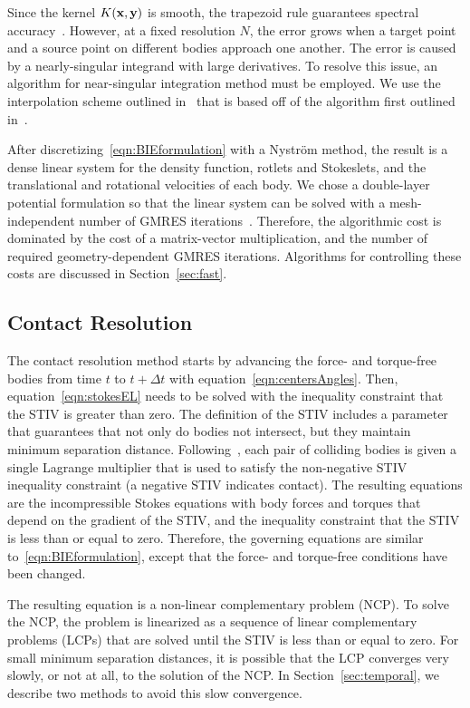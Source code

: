 \documentclass[AMA,STIX1COL]{WileyNJD-v2}
\begin{document}
Since the kernel $K({\mathbf{x}},{\mathbf{y}})$ is smooth, the trapezoid rule guarantees
spectral accuracy~\cite{Trefethan2014}.  However, at a fixed resolution
$N$, the error grows when a target point and a source point on different
bodies approach one another.  The error is caused by a nearly-singular
integrand with large derivatives.  To resolve this issue, an algorithm
for near-singular integration method must be employed.  We use the
interpolation scheme outlined in~\cite{Quaife2014} that is based off of
the algorithm first outlined in~\cite{Ying2006}.
  
After discretizing~\eqref{eqn:BIEformulation} with a Nystr\"om method,
the result is a dense linear system for the density function, rotlets
and Stokeslets, and the translational and rotational velocities of each
body.  We chose a double-layer potential formulation so that the linear
system can be solved with a mesh-independent number of GMRES
iterations~\cite{Campbell1996}.  Therefore, the algorithmic cost is
dominated by the cost of a matrix-vector multiplication, and the number
of required geometry-dependent GMRES iterations.  Algorithms for
controlling these costs are discussed in Section~\ref{sec:fast}.

\subsection{Contact Resolution}
\label{sec:contact}
The contact resolution method starts by advancing the force- and
torque-free bodies from time $t$ to $t + \Delta t$ with
equation~\eqref{eqn:centersAngles}.  Then, equation~\eqref{eqn:stokesEL}
needs to be solved with the inequality constraint that the STIV is
greater than zero.  The definition of the STIV includes a parameter that
guarantees that not only do bodies not intersect, but they maintain
minimum separation distance. Following~\cite{Lu2017}, each pair of
colliding bodies is given a single Lagrange multiplier that is used to
satisfy the non-negative STIV inequality constraint (a negative STIV
indicates contact).  The resulting equations are the incompressible
Stokes equations with body forces and torques that depend on the
gradient of the STIV, and the inequality constraint that the STIV is
less than or equal to zero.  Therefore, the governing equations are
similar to~\eqref{eqn:BIEformulation}, except that the force- and
torque-free conditions have been changed.

The resulting equation is a non-linear complementary problem (NCP). To
solve the NCP, the problem is linearized as a sequence of linear
complementary problems (LCPs) that are solved until the STIV is less
than or equal to zero.  For small minimum separation distances, it is
possible that the LCP converges very slowly, or not at all, to the
solution of the NCP.  In Section~\ref{sec:temporal}, we describe two
methods to avoid this slow convergence.
\end{document}
